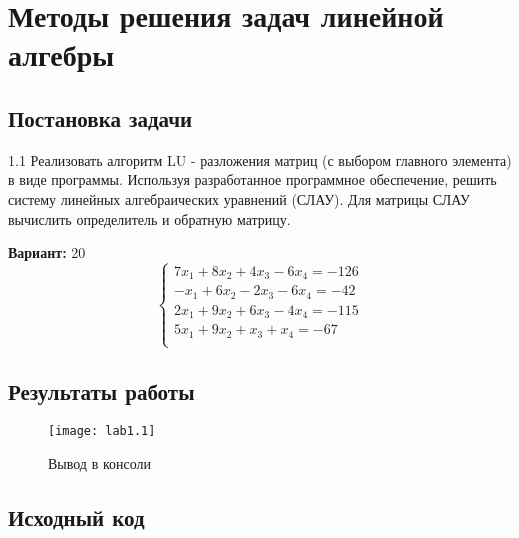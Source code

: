\section{Методы решения задач линейной алгебры}

\subsection{Постановка задачи}
1.1 Реализовать алгоритм LU -  разложения матриц (с выбором главного элемента) в виде программы. Используя разработанное программное обеспечение, решить систему линейных алгебраических уравнений (СЛАУ). Для матрицы СЛАУ вычислить определитель и обратную матрицу.

{\bfseries Вариант:} 20
\begin{equation}
        \left\{ 
        \begin{array}{ll} 
        7x_1 + 8x_2 + 4x_3 - 6x_4 = -126\\
        -x_1 + 6x_2 - 2x_3 - 6x_4 = -42\\
        2x_1 + 9x_2 + 6x_3 - 4x_4 = -115\\
        5x_1 + 9x_2 + x_3 + x_4 = -67\\
        \end{array}\right.
\end{equation}
\pagebreak

\subsection{Результаты работы}

\begin{figure}[h!]
\centering
\texttt{[image: lab1.1]}
\caption{Вывод в консоли}
\end{figure}
\pagebreak

\vfill

\subsection{Исходный код}


\pagebreak